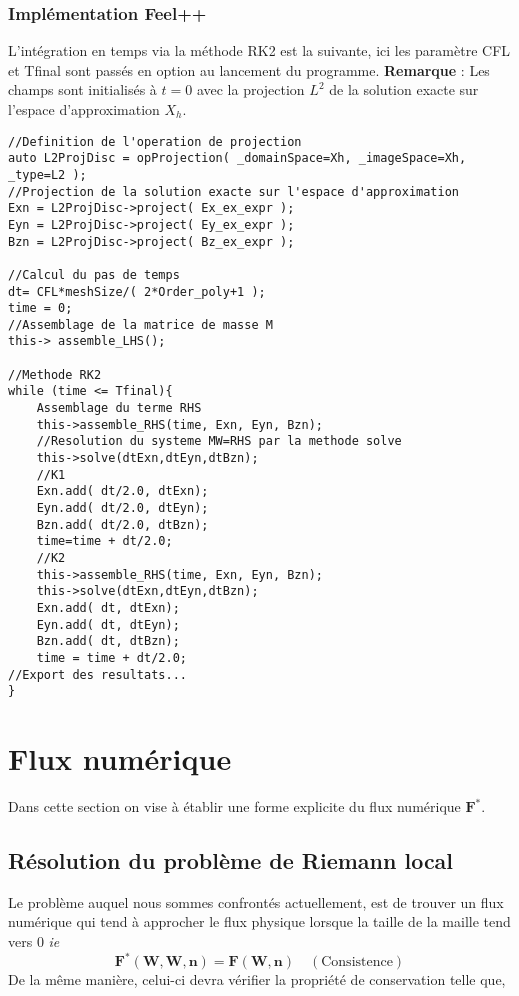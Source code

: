 \documentclass[a4paper,oneside,10pt]{report}
\begin{document}
\subsubsection{Implémentation \textbf{Feel++}}
L'intégration en temps via la méthode RK2 est la suivante, ici les paramètre CFL et Tfinal sont passés en option au lancement du programme.
\textbf{Remarque} : Les champs sont initialisés à $t=0$ avec la projection $L^2$ de la solution exacte sur l'espace d'approximation $X_h$.
\begin{center}
\begin{minipage}{\textwidth}
\begin{lstlisting}[label=code2,caption=Integration en temps : run()]
//Definition de l'operation de projection
auto L2ProjDisc = opProjection( _domainSpace=Xh, _imageSpace=Xh, _type=L2 );
//Projection de la solution exacte sur l'espace d'approximation
Exn = L2ProjDisc->project( Ex_ex_expr );
Eyn = L2ProjDisc->project( Ey_ex_expr );
Bzn = L2ProjDisc->project( Bz_ex_expr );

//Calcul du pas de temps
dt= CFL*meshSize/( 2*Order_poly+1 );
time = 0;
//Assemblage de la matrice de masse M
this-> assemble_LHS();

//Methode RK2
while (time <= Tfinal){
	Assemblage du terme RHS
	this->assemble_RHS(time, Exn, Eyn, Bzn);
	//Resolution du systeme MW=RHS par la methode solve
	this->solve(dtExn,dtEyn,dtBzn);
	//K1
	Exn.add( dt/2.0, dtExn);
	Eyn.add( dt/2.0, dtEyn);
	Bzn.add( dt/2.0, dtBzn);
	time=time + dt/2.0;
	//K2
	this->assemble_RHS(time, Exn, Eyn, Bzn);
	this->solve(dtExn,dtEyn,dtBzn);
	Exn.add( dt, dtExn);
	Eyn.add( dt, dtEyn);
	Bzn.add( dt, dtBzn);
	time = time + dt/2.0;
//Export des resultats...
}
\end{lstlisting}
\end{minipage}
\end{center}

\section{Flux numérique}
Dans cette section on vise à établir une forme explicite du flux numérique $\mathbf{F}^*$.
\subsection{Résolution du problème de Riemann local}
Le problème auquel nous sommes confrontés actuellement, est de trouver un flux numérique qui tend à approcher le flux physique lorsque la taille de la maille tend vers 0 \textit{ie}
\begin{equation}
\mathbf{F}^*(\mathbf{W},\mathbf{W},\mathbf{n}) = \mathbf{F }(\mathbf{W},\mathbf{n}) \quad (\mbox{Consistence})
\end{equation}
De la même manière, celui-ci devra vérifier la propriété de conservation telle que, 
\end{document}
